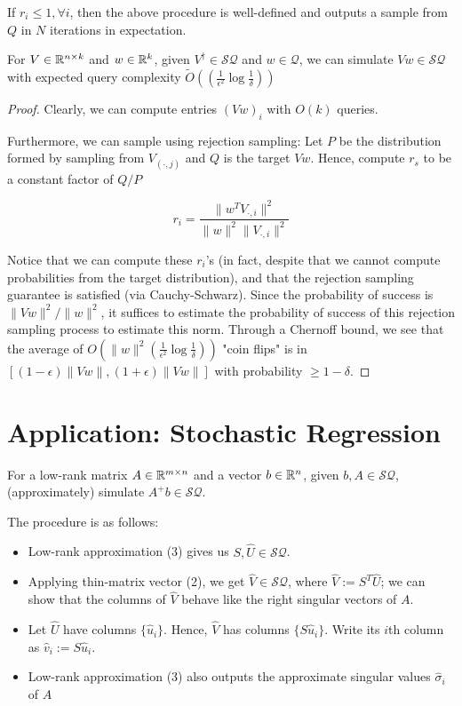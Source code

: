 \documentclass[main.tex]{subfiles}
\begin{document}
\begin{fact}
If $r_i \leq 1, \forall i$, then the above procedure is well-defined and outputs a sample from $Q$ in $N$ iterations in expectation.	
\end{fact}


\begin{proposition}
	 For $V \in \mathbb{R}^{n\times k}$ and $w \in \mathbb{R}^k$, given $V^\dag \in \mathcal{SQ}$ and $w \in \mathcal{Q}$, we can simulate $Vw \in \mathcal{SQ}$ with expected query complexity $\tilde{O}((\frac{1}{\epsilon^2}\log\frac{1}{\delta}))$

\begin{proof}
Clearly, we can compute entries $(Vw)_i$ with $O(k)$ queries.

Furthermore, we can sample using rejection sampling: Let $P$ be the distribution formed by sampling from $V_{(\cdot, j)}$ and $Q$ is the target $Vw$. Hence, compute $r_s$ to be a constant factor of $Q / P$

$$r_i = \frac{\|w^T V_{\cdot, i}\|^2}{\|w\|^2\|V_{\cdot, i}\|^2}$$

Notice that we can compute these $r_i$'s (in fact, despite that we cannot compute probabilities from the target distribution), and that the rejection sampling guarantee is satisfied (via Cauchy-Schwarz). Since the probability of success is $\|Vw\|^2/ \| w\|^2$, it suffices to estimate the probability of success of this rejection sampling process to estimate this norm. Through a Chernoff bound, we see that the average of $O(\|w\|^2(\frac{1}{\epsilon^2}\log\frac{1}{\delta}))$ "coin flips" is in $[(1-\epsilon)\|Vw\|,(1+\epsilon)\|Vw\|]$ with probability $\geq 1-\delta$.
\end{proof}
\end{proposition}

\section{Application: Stochastic Regression}

For a low-rank matrix $A \in \mathbb{R}^{m\times n}$
  and a vector $b \in \mathbb{R}^n$, given $b, A \in \mathcal{SQ}$, (approximately) simulate $A^+b \in \mathcal{SQ}$.

\begin{algorithm}   	
The procedure is as follows:
\begin{itemize}
\item Low-rank approximation (3) gives us $S,\hat{U} \in \mathcal{SQ}$.

\item Applying thin-matrix vector (2), we get $\hat{V} \in \mathcal{SQ}$, where $\hat{V} := S^T\hat{U}$; we can show that the columns of $\hat{V}$ behave like the right singular vectors of $A$.
\item Let $\hat{U}$ have columns $\{ \hat{u}_i\}$. Hence, $\hat{V}$ has columns $\{ S \hat{u}_i \}$. Write its $i$th column as $\hat{v}_i := S\hat{u}_i$.

\item Low-rank approximation (3) also outputs the approximate singular values $\hat{\sigma}_i$ of $A$
\end{itemize}
\end{algorithm}
\end{document}

